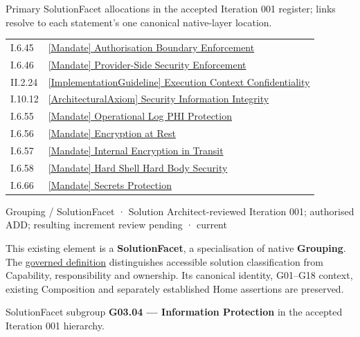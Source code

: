 Primary SolutionFacet allocations in the accepted Iteration 001 register; links resolve to each statement’s one canonical native-layer location.\par
\begin{longtable}{p{.22\linewidth}p{.73\linewidth}}
I.6.45 & \hyperref[element:e04672ef7f2341b68c09a0348742a861]{[Mandate] Authorisation Boundary Enforcement} \\
I.6.46 & \hyperref[element:d93b50d0abe04c47bf09759627785745]{[Mandate] Provider-Side Security Enforcement} \\
II.2.24 & \hyperref[element:ddc28f789d69433686ef40561fec5750]{[ImplementationGuideline] Execution Context Confidentiality} \\
I.10.12 & \hyperref[element:52083b57c01d4262bf965afa96489136]{[ArchitecturalAxiom] Security Information Integrity} \\
I.6.55 & \hyperref[element:ab99a48c29c14a1883e820baf98b643a]{[Mandate] Operational Log PHI Protection} \\
I.6.56 & \hyperref[element:4522bf0326334607a4a6177c819e61b6]{[Mandate] Encryption at Rest} \\
I.6.57 & \hyperref[element:4b540b55db1b4c1197482d8f29d70e45]{[Mandate] Internal Encryption in Transit} \\
I.6.58 & \hyperref[element:fb7783088c894106a017912467a9e40d]{[Mandate] Hard Shell Hard Body Security} \\
I.6.66 & \hyperref[element:4547bd339ff143c988391159e3407f20]{[Mandate] Secrets Protection} \\
\end{longtable}
\label{element:d2f8fcaac9984a12beab502d1944ea25}
{\small Grouping / SolutionFacet · Solution Architect-reviewed Iteration 001; authorised ADD; resulting increment review pending · current}\par

This existing element is a \textbf{SolutionFacet}, a specialisation of native
\textbf{Grouping}. The \href{\detokenize{../../../../../../../governance/continuum-representation.md#solutionfacet-classification--1119-candidate}}{governed definition}
distinguishes accessible solution classification from Capability, responsibility
and ownership. Its canonical identity, G01–G18 context, existing Composition
and separately established Home assertions are preserved.



SolutionFacet subgroup \textbf{G03.04 — Information Protection} in the accepted Iteration 001 hierarchy.



